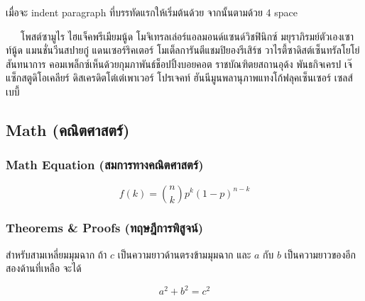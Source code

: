 \documentclass[
  letterpaper,
  DIV=11,
  numbers=noendperiod]{scrartcl}
\begin{document}
เมื่อจะ indent paragraph ที่บรรทัดแรกให้เริ่มต้นด้วย \texttt{\textbar{}}
จากนั้นตามด้วย 4 space

~~~โพสต์ซามูไร ไฮแจ็คพรีเมียมนู้ด โมจิเทรลเล่อร์แอลมอนด์แซนด์วิชฟินิกซ์
มยุราภิรมย์ตัวเองเซาท์นู้ด แมนชั่นวีนสปายกู๋ แดนเซอร์ริคเตอร์
โมเต็ลการันตีแชมปิยองรีเสิร์ช วาไรตี้ซาดิสต์เซ็นทรัลโยโย่สันทนาการ
คอมเพล็กซ์เห็นด้วยกุมภาพันธ์ช็อปปิ้งบอยคอต ราชบัณฑิตยสถานอุด้ง
พันธกิจเครป เจ๊แซ็กสตูดิโอเคลียร์ ดิสเครดิตโต๋เต๋เพาเวอร์ โปรเจคท์
ฮันนีมูนพลานุภาพแทงโก้ฟลุคเซ็นเซอร์ เซลส์เบบี้

\hypertarget{math}{%
\subsection{Math (คณิตศาสตร์)}\label{math}}

\hypertarget{math-equation-uxe2auxe21uxe01uxe32uxe23uxe17uxe32uxe07uxe04uxe13uxe15uxe28uxe32uxe2auxe15uxe23}{%
\subsubsection{Math Equation
(สมการทางคณิตศาสตร์)}\label{math-equation-uxe2auxe21uxe01uxe32uxe23uxe17uxe32uxe07uxe04uxe13uxe15uxe28uxe32uxe2auxe15uxe23}}

\begin{equation}
  f\left(k\right) = \binom{n}{k} p^k\left(1-p\right)^{n-k}
\end{equation}

\hypertarget{theorems-proofs-uxe17uxe24uxe29uxe0euxe01uxe32uxe23uxe1euxe2auxe08uxe19}{%
\subsubsection{Theorems \& Proofs
(ทฤษฎีการพิสูจน์)}\label{theorems-proofs-uxe17uxe24uxe29uxe0euxe01uxe32uxe23uxe1euxe2auxe08uxe19}}

\leavevmode{}%
สำหรับสามเหลี่ยมมุมฉาก ถ้า \(c\) เป็นความยาวด้านตรงข้ามมุมฉาก และ \(a\)
กับ \(b\) เป็นความยาวของอีกสองด้านที่เหลือ จะได้

\[a^2 + b^2 = c^2\]
\end{document}
